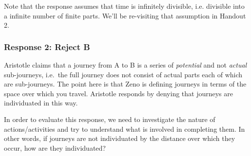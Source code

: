 \documentclass[]{article}
\begin{document}
Note that the response assumes that time is infinitely divisible, i.e.
divisible into a infinite number of finite parts. We'll be re-visiting
that assumption in Handout 2.

\subsubsection{Response 2: Reject B}\label{response-2-reject-b}

Aristotle claims that a journey from A to B is a series of
\emph{potential} and not \emph{actual} sub-journeys, i.e.~the full
journey does not consist of actual parts each of which are sub-journeys.
The point here is that Zeno is defining journeys in terms of the space
over which you travel. Aristotle responds by denying that journeys are
individuated in this way.

In order to evaluate this response, we need to investigate the nature of
actions/activities and try to understand what is involved in completing
them. In other words, if journeys are not individuated by the distance
over which they occur, how are they individuated?
\end{document}
